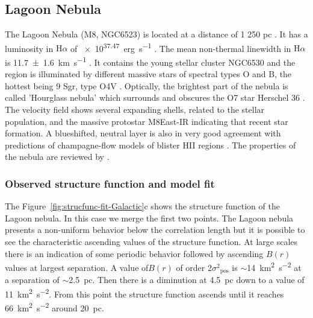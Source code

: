 \documentclass[fleqn,usenatbib, useAMS, a4paper]{mnras}
\newcommand\pos{\ensuremath{_{\mathrm{pos}}}}
\newcommand\ha{\ensuremath{\text{H}\alpha}}
\begin{document}
\subsection{Lagoon Nebula}
\label{sec:lagoon-nebula}

The Lagoon Nebula (M8, NGC6523) is located at a distance of 1 250 pc \citetext{\SI{1}{\arcsecond} = \SI{0.006}{pc} ; \citealp{2005A&A...430..941P}}.
It has a luminosity in \ha{} of \SI{e37.47}{erg.s^{-1}} \citep{1984ApJ...287..116K}.
The mean non-thermal linewidth in \ha{} is \SI{11.7 \pm 1.6}{km.s^{-1}} \citep{1973ApJ...183..851B}.
It contains the young stellar cluster NGC6530 and the region is illuminated by different massive stars of spectral types O and B, the hottest being 9 Sgr, type O4V \citep{Damiani:2017b}.
Optically, the brightest part of the nebula is called 'Hourglass nebula' which surrounds and obscures the O7 star Herschel 36 \citep{1986AJ.....91..870W}. 
The velocity field shows several expanding shells, related to the stellar population, and the massive protostar M8East-IR \citep{1984ApJ...278..170S} indicating that recent star formation. 
A blueshifted, neutral layer is also in very good agreement with predictions of champagne-flow models of blister HII regions \citep{Damiani:2017b}. 
The properties of the nebula are reviewed by \citet{2008hsf2.book..533T}.

\subsubsection{Observed structure function and model fit}
\label{sec:observ-struct-funct-lagoon}

The Figure~\ref{fig:strucfunc-fit-Galactic}c shows the structure function of the Lagoon nebula.
In this case we merge the first two points.
The Lagoon nebula presents a non-uniform behavior below the correlation length but it is possible to see the characteristic ascending values of the structure function.
At large scales there is an indication of some periodic behavior followed by ascending \(B(r)\) values at largest separation.
A value of\(B(r)\) of order 2\(\sigma^2\pos\) is \(\sim\)\SI{14}{km^{2}.s^{-2}} at a separation of \(\sim\)\SI{2.5}{pc}. 
Then there is a diminution at \SI{4.5}{pc} down to a value of \SI{11}{km^{2}.s^{-2}}.
From this point the structure function ascends until it reaches \SI{66}{km^{2}.s^{-2}} around \SI{20}{pc}.
\end{document}
